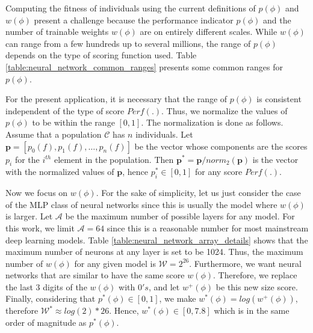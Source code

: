 \documentclass[preprint,12pt]{elsarticle}%
\begin{document}
Computing the fitness of individuals using the current definitions of $p(\phi)$ and $w(\phi)$ present a challenge because the performance indicator $p(\phi)$ and the number of trainable weights $w(\phi)$ are on entirely different scales. While $w(\phi)$ can range from a few hundreds up to several millions, the range of $p(\phi)$ depends on the type of scoring function used. Table \ref{table:neural_network_common_ranges} presents some common ranges for $p(\phi)$. 

\begin{table}[H]
\begin{center}
\scalebox{1}{
\begin{tabular}{| c | c | c |}
\hline
${Perf}(.)$ & Range & Common range \\
\hline
Accuracy & $\left[ 0, 1 \right]$ & $\left[ 0, 1 \right]$\\
Precision & $\left[ 0, 1 \right]$ & $\left[ 0, 1 \right]$\\
Recall & $\left[ 0, 1 \right]$ & $\left[ 0, 1 \right]$\\
MSE & $\left[ 0, +\infty \right)$ & $\left[ 0, 10^4 \right]$\\
RMSE & $\left[ 0, +\infty \right)$ & $\left[ 0, 10^2 \right]$\\
\hline
\end{tabular}
}
\end{center}
\caption{Common ranges for some neural network performance indicators.}
\label{table:neural_network_common_ranges}
\end{table}

For the present application, it is necessary that the range of $p(\phi)$ is consistent independent of the type of score ${Perf}(.)$. Thus, we normalize the values of $p(\phi)$ to be within the range $[ 0,1]$. The normalization is done as follows. Assume that a population $\mathcal{C}$ has $n$ individuals. Let $\mathbf{p} = \left[ p_0(f), p_1(f), \ldots, p_n(f) \right]$ be the vector whose components are the scores $p_i$ for the $i^{th}$ element in the population. Then $\mathbf{p}^* = \mathbf{p}/norm_2(\mathbf{p})$ is the vector with the normalized values of $\mathbf{p}$, hence $p^*_i \in \left[ 0, 1 \right]$ for any score ${Perf}(.)$.

Now we focus on $w(\phi)$. For the sake of simplicity, let us just consider the case of the MLP class of neural networks since this is usually the model where $w(\phi)$ is larger. Let $\mathcal{A}$ be the maximum number of possible layers for any model. For this work, we limit $\mathcal{A} = 64$ since this is a reasonable number for most mainstream deep learning models. Table \ref{table:neural_network_array_details} shows that the maximum number of neurons at any layer is set to be 1024. Thus, the maximum number of $w(\phi)$ for any given model is $\mathcal{W} = 2^{26}$. Furthermore, we want neural networks that are similar to have the same score $w(\phi)$. Therefore, we replace the last 3 digits of the $w(\phi)$ with $0's$, and let $w^+(\phi)$ be this new size score. Finally, considering that $p^*(\phi) \in \left[ 0, 1 \right]$, we make $w^*(\phi) = log(w^+(\phi))$, therefore $\mathcal{W}^* \approx  log(2)*26$. Hence, $w^*(\phi) \in \left[0, 7.8\right]$ which is in the same order of magnitude as $p^*(\phi)$.
\end{document}
